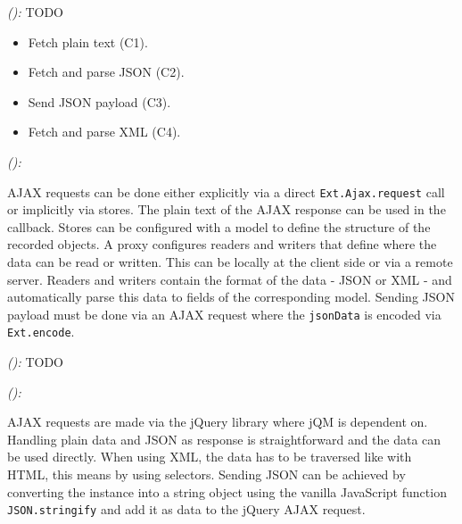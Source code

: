 \documentclass[a4paper]{artikel3}
\newcommand{\code}[1]{\texttt{#1}}
\newcommand{\framework}[2]{ \emph{#1 (\textbf{#2}): }} %
\begin{document}
\framework{\lungoa{}}{}
TODO

% 
% 

\begin{itemize}
  \item Fetch plain text (C1).
  \item Fetch and parse JSON (C2).
  \item Send JSON payload (C3).
  \item Fetch and parse XML (C4).
\end{itemize}

\framework{\sta{}}{}

AJAX requests can be done either explicitly via a direct \code{Ext.Ajax.request} call or implicitly via stores.  
The plain text of the AJAX response can be used in the callback.   
Stores can be configured with a model to define the structure of the recorded objects.  
A proxy configures readers and writers that define where the data can be read or written.  
This can be locally at the client side or via a remote server.  
Readers and writers contain the format of the data - JSON or XML - and automatically parse this data to fields of the corresponding model. 
Sending JSON payload must be done via an AJAX request where the \code{jsonData} is encoded via \code{Ext.encode}.

\framework{\kendoa{}}{}
TODO

\framework{\jqma{}}{}

AJAX requests are made via the jQuery library where jQM is dependent on.
Handling plain data and JSON as response is straightforward and the data can be used directly.
When using XML, the data has to be traversed like with HTML, this means by using selectors.
Sending JSON can be achieved by converting the instance into a string object using the vanilla JavaScript function \code{JSON.stringify} and add it as data to the jQuery AJAX request.
\end{document}
